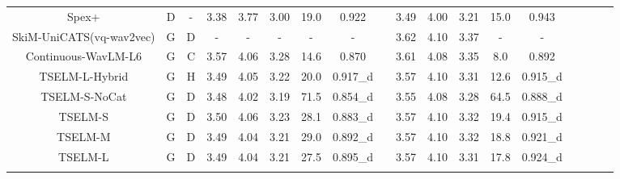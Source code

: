 \documentclass[conference]{IEEEtran}
\begin{document}
\begin{table}
\begin{center}
\begin{tabular}{cccccccccccccccccc}
  Spex+\cite{spex_plus}                   & D                                             & -                                                                                  & 3.38        & 3.77       & 3.00       & 19.0            & 0.922     &          & 3.49        & 4.00       & 3.21       & 15.0            & 0.943             \\
  SkiM-UniCATS(vq-wav2vec)\cite{gen_tse}                   & G                                             & D                                                                                  & -        & -      & -       & -            & -     &          & 3.62        & 4.10       & 3.37       & -            & -             \\ \hline
  Continuous-WavLM-L6     & G                                             & C                                                                                  & 3.57        & 4.06       & 3.28       & 14.6            & 0.870     &          & 3.61        & 4.08       & 3.35       & 8.0            & 0.892             \\
  TSELM-L-Hybrid          & G                                             & H                                                                                     & 3.49        & 4.05       & 3.22       & 20.0            & 0.917\_d  &          & 3.57        & 4.10       & 3.31       & 12.6            & 0.915\_d             \\
  TSELM-S-NoCat       & G                                             & D                                                                                   & 3.48        & 4.02       & 3.19       & 71.5            & 0.854\_d    &        & 3.55        & 4.08       & 3.28       & 64.5            & 0.888\_d         \\ \hline
  TSELM-S                 & G                                             & D                                                                                    & 3.50        & 4.06       & 3.23       & 28.1            & 0.883\_d      &      & 3.57        & 4.10       & 3.32       & 19.4            & 0.915\_d            \\
  TSELM-M                 & G                                             & D                                                                                   & 3.49        & 4.04       & 3.21       & 29.0            & 0.892\_d    &        & 3.57        & 4.10       & 3.32       & 18.8            & 0.921\_d             \\
  TSELM-L                 & G                                             & D                                                                                  & 3.49        & 4.04       & 3.21       & 27.5            & 0.895\_d    &        & 3.57        & 4.10       & 3.31       & 17.8            & 0.924\_d        \\
  \Xhline{2\arrayrulewidth} %
  \end{tabular}
  \label{main_exp}
\end{center}
\vspace{-8pt}
  \end{table}
\end{document}
